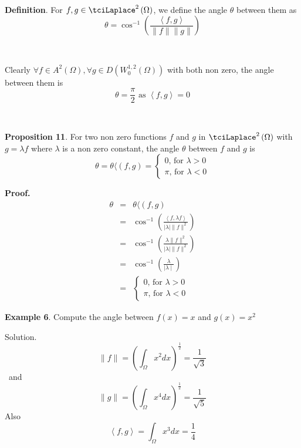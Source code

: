 \documentclass{amsproc}
\theoremstyle{plain}
\numberwithin{equation}{section}
\begin{document}
\ \ \ \ \ 

\textbf{Definition}. For $f,g\in \tciLaplace ^{2}\left( \Omega \right) $, we
define the angle $\theta $ between them as 
\begin{equation*}
\theta =\cos ^{-1}\left( \frac{\left\langle f,g\right\rangle }{\parallel
f\parallel \parallel g\parallel }\right)
\end{equation*}

\ \ 

Clearly $\forall f\in A^{2}\left( \Omega \right) ,\forall g\in D\left(
W_{0}^{1,2}\left( \Omega \right) \right) $ with both non zero, the angle
between them is\begin{equation*}
\theta =\frac{\pi }{2}\text{ \ \ as \ \ }\left\langle f,g\right\rangle =0
\end{equation*}

\ \ 

\textbf{Proposition 11}. For two non zero functions $f$ and $g$ in $\tciLaplace ^{2}\left( \Omega \right) $ with $g=\lambda f$ where $\lambda $
is a non zero constant, the angle $\theta $ between $f$ and $g$ is 
\begin{equation*}
\theta =\theta \langle (f,g)=\left\{ 
\begin{array}{c}
0\text{, for }\lambda >0 \\ 
\pi \text{, for }\lambda <0\end{array}\right.
\end{equation*}

\textbf{Proof.} 
\begin{eqnarray*}
\theta &=&\theta \langle (f,g) \\
&=&\cos ^{-1}\left( \frac{\left\langle f,\lambda f\right\rangle }{\mid
\lambda \mid \parallel f\parallel ^{2}}\right) \\
&=&\cos ^{-1}\left( \frac{\lambda \parallel f\parallel ^{2}}{\mid \lambda
\mid \parallel f\parallel ^{2}}\right) \\
&=&\cos ^{-1}\left( \frac{\lambda }{\mid \lambda \mid }\right) \\
&=&\left\{ 
\begin{array}{c}
0\text{, for }\lambda >0 \\ 
\pi \text{, for }\lambda <0\end{array}\right.
\end{eqnarray*}

\textbf{Example 6}. Compute the angle between $f(x)=x$ and $g(x)=x^{2}$

Solution. 
\begin{equation*}
\parallel f\parallel =\left( \int_{\Omega }x^{2}dx\right) ^{\frac{1}{2}}=\frac{1}{\sqrt{3}}
\end{equation*}
\ and 
\begin{equation*}
\parallel g\parallel =\left( \int_{\Omega }x^{4}dx\right) ^{\frac{1}{2}}=\frac{1}{\sqrt{5}}
\end{equation*}
Also 
\begin{equation*}
\left\langle f,g\right\rangle =\int_{\Omega }x^{3}dx=\frac{1}{4}
\end{equation*}
\end{document}
